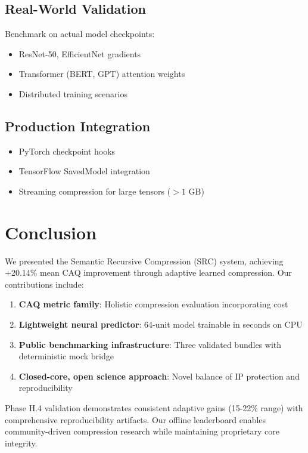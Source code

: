 \documentclass[11pt,twocolumn]{article}
\begin{document}
\subsection{Real-World Validation}

Benchmark on actual model checkpoints:
\begin{itemize}
    \item ResNet-50, EfficientNet gradients
    \item Transformer (BERT, GPT) attention weights
    \item Distributed training scenarios
\end{itemize}

\subsection{Production Integration}

\begin{itemize}
    \item PyTorch checkpoint hooks
    \item TensorFlow SavedModel integration
    \item Streaming compression for large tensors ($> 1$ GB)
\end{itemize}

\section{Conclusion}

We presented the Semantic Recursive Compression (SRC) system, achieving +20.14\% mean CAQ improvement through adaptive learned compression. Our contributions include:

\begin{enumerate}
    \item \textbf{CAQ metric family}: Holistic compression evaluation incorporating cost
    \item \textbf{Lightweight neural predictor}: 64-unit model trainable in seconds on CPU
    \item \textbf{Public benchmarking infrastructure}: Three validated bundles with deterministic mock bridge
    \item \textbf{Closed-core, open science approach}: Novel balance of IP protection and reproducibility
\end{enumerate}

Phase H.4 validation demonstrates consistent adaptive gains (15-22\% range) with comprehensive reproducibility artifacts. Our offline leaderboard enables community-driven compression research while maintaining proprietary core integrity.
\end{document}
